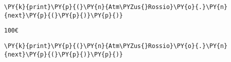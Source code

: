 
{\par%
\vspace{-1\baselineskip}%
}%
\begin{notebookcell}[14]%
\begin{addmargin}[\cellleftmargin]{0em}%
{\smaller%
\par%
%
\vspace{-1\smallerfontscale}%
\begin{Verbatim}[commandchars=\\\{\}]
\PY{k}{print}\PY{p}{(}\PY{n}{Atm\PYZus{}Rossio}\PY{o}{.}\PY{n}{next}\PY{p}{(}\PY{p}{)}\PY{p}{)}
\end{Verbatim}
%
\par%
\vspace{-1\smallerfontscale}}%
\end{addmargin}
\end{notebookcell}

\par\vspace{1\smallerfontscale}%
    \begin{addmargin}[\cellleftmargin]{0em}%
    {\smaller%
    \vspace{-1\smallerfontscale}%
    
    \begin{Verbatim}[commandchars=\\\{\}]
100€
    \end{Verbatim}
}%
    \end{addmargin}%

{\par%
\vspace{-1\baselineskip}%
}%
\begin{notebookcell}[15]%
\begin{addmargin}[\cellleftmargin]{0em}%
{\smaller%
\par%
%
\vspace{-1\smallerfontscale}%
\begin{Verbatim}[commandchars=\\\{\}]
\PY{k}{print}\PY{p}{(}\PY{n}{Atm\PYZus{}Rossio}\PY{o}{.}\PY{n}{next}\PY{p}{(}\PY{p}{)}\PY{p}{)}
\end{Verbatim}
%
\par%
\vspace{-1\smallerfontscale}}%
\end{addmargin}
\end{notebookcell}


